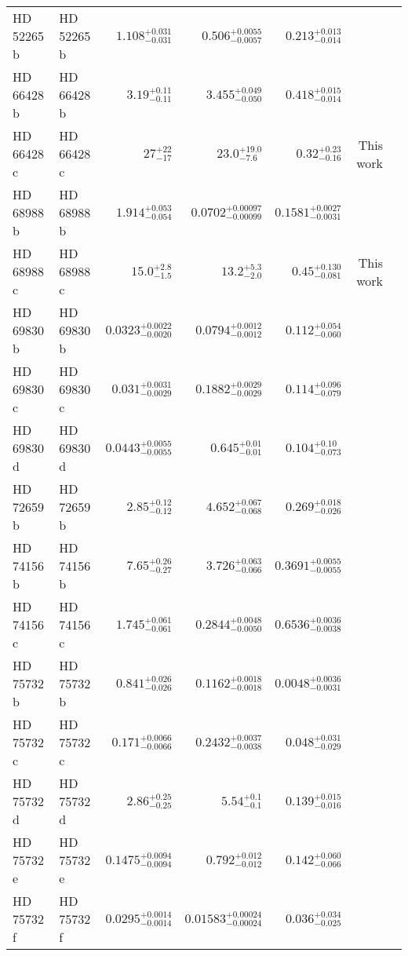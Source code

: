 \begin{longtable*}{llrrrrr}
HD 52265 b & HD 52265 b & $1.108^{+0.031}_{-0.031}$ & $0.506^{+0.0055}_{-0.0057}$ & $0.213^{+0.013}_{-0.014}$ & \cite{Butler00} & \\ 
HD 66428 b & HD 66428 b & $3.19^{+0.11}_{-0.11}$ & $3.455^{+0.049}_{-0.050}$ & $0.418^{+0.015}_{-0.014}$ & \cite{Butler06} & \\ 
HD 66428 c & HD 66428 c & $27^{+22}_{-17}$ & $23.0^{+19.0}_{-7.6}$ & $0.32^{+0.23}_{-0.16}$ & This work & \\ 
HD 68988 b & HD 68988 b & $1.914^{+0.053}_{-0.054}$ & $0.0702^{+0.00097}_{-0.00099}$ & $0.1581^{+0.0027}_{-0.0031}$ & \cite{Vogt02} & \\ 
HD 68988 c & HD 68988 c & $15.0^{+2.8}_{-1.5}$ & $13.2^{+5.3}_{-2.0}$ & $0.45^{+0.130}_{-0.081}$ & This work & \\ 
HD 69830 b & HD 69830 b & $0.0323^{+0.0022}_{-0.0020}$ & $0.0794^{+0.0012}_{-0.0012}$ & $0.112^{+0.054}_{-0.060}$ & \cite{Lovis06} & \\ 
HD 69830 c & HD 69830 c & $0.031^{+0.0031}_{-0.0029}$ & $0.1882^{+0.0029}_{-0.0029}$ & $0.114^{+0.096}_{-0.079}$ & \cite{Lovis06} & \\ 
HD 69830 d & HD 69830 d & $0.0443^{+0.0055}_{-0.0055}$ & $0.645^{+0.01}_{-0.01}$ & $0.104^{+0.10}_{-0.073}$ & \cite{Lovis06} & \\ 
HD 72659 b & HD 72659 b & $2.85^{+0.12}_{-0.12}$ & $4.652^{+0.067}_{-0.068}$ & $0.269^{+0.018}_{-0.026}$ & \cite{Butler03} & \\ 
HD 74156 b & HD 74156 b & $7.65^{+0.26}_{-0.27}$ & $3.726^{+0.063}_{-0.066}$ & $0.3691^{+0.0055}_{-0.0055}$ & \cite{Naef04} & \\ 
HD 74156 c & HD 74156 c & $1.745^{+0.061}_{-0.061}$ & $0.2844^{+0.0048}_{-0.0050}$ & $0.6536^{+0.0036}_{-0.0038}$ & \cite{Naef04} & \\ 
HD 75732 b & HD 75732 b & $0.841^{+0.026}_{-0.026}$ & $0.1162^{+0.0018}_{-0.0018}$ & $0.0048^{+0.0036}_{-0.0031}$ & \cite{Butler97} & \\ 
HD 75732 c & HD 75732 c & $0.171^{+0.0066}_{-0.0066}$ & $0.2432^{+0.0037}_{-0.0038}$ & $0.048^{+0.031}_{-0.029}$ & \cite{McArthur04} & \\ 
HD 75732 d & HD 75732 d & $2.86^{+0.25}_{-0.25}$ & $5.54^{+0.1}_{-0.1}$ & $0.139^{+0.015}_{-0.016}$ & \cite{Marcy02} & \\ 
HD 75732 e & HD 75732 e & $0.1475^{+0.0094}_{-0.0094}$ & $0.792^{+0.012}_{-0.012}$ & $0.142^{+0.060}_{-0.066}$ & \cite{McArthur04} & \\ 
HD 75732 f & HD 75732 f & $0.0295^{+0.0014}_{-0.0014}$ & $0.01583^{+0.00024}_{-0.00024}$ & $0.036^{+0.034}_{-0.025}$ & \cite{Fischer08} & \\ 

\end{longtable*}
